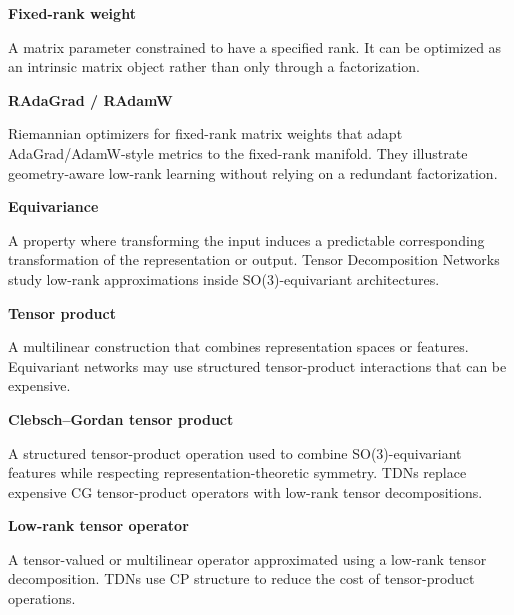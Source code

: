 \documentclass[10pt]{article}
\newenvironment{glossaryentry}[1]{%
  \par\medskip\noindent
  {\large\bfseries #1}\par\smallskip
}{\par\medskip}
\begin{document}
\begin{glossaryentry}{Fixed-rank weight}
A matrix parameter constrained to have a specified rank. It can be optimized as an intrinsic matrix object rather than only through a factorization.
\par\smallskip{\small\color{muted}[BIA25]}
\end{glossaryentry}


\begin{glossaryentry}{RAdaGrad / RAdamW}
Riemannian optimizers for fixed-rank matrix weights that adapt AdaGrad/AdamW-style metrics to the fixed-rank manifold. They illustrate geometry-aware low-rank learning without relying on a redundant factorization.
\par\smallskip{\small\color{muted}[BIA25]}
\end{glossaryentry}


\begin{glossaryentry}{Equivariance}
A property where transforming the input induces a predictable corresponding transformation of the representation or output. Tensor Decomposition Networks study low-rank approximations inside SO(3)-equivariant architectures.
\par\smallskip{\small\color{muted}[LIN25]}
\end{glossaryentry}


\begin{glossaryentry}{Tensor product}
A multilinear construction that combines representation spaces or features. Equivariant networks may use structured tensor-product interactions that can be expensive.
\par\smallskip{\small\color{muted}[LIN25]}
\end{glossaryentry}


\begin{glossaryentry}{Clebsch--Gordan tensor product}
A structured tensor-product operation used to combine SO(3)-equivariant features while respecting representation-theoretic symmetry. TDNs replace expensive CG tensor-product operators with low-rank tensor decompositions.
\par\smallskip{\small\color{muted}[LIN25]}
\end{glossaryentry}


\begin{glossaryentry}{Low-rank tensor operator}
A tensor-valued or multilinear operator approximated using a low-rank tensor decomposition. TDNs use CP structure to reduce the cost of tensor-product operations.
\par\smallskip{\small\color{muted}[LIN25]}
\end{glossaryentry}
\end{document}
